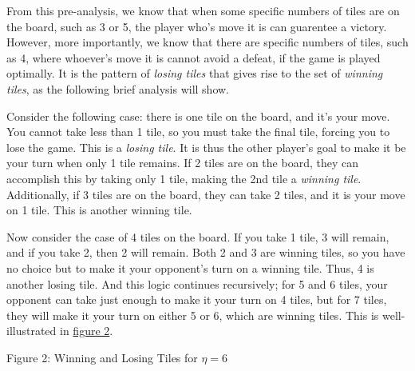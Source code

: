 \documentclass[11pt, letterpaper]{article}
\begin{document}
From this pre-analysis, we know that when some  specific numbers of tiles are on the board, such as 3 or 5, the player who's move it is can guarentee a victory. However, more importantly, we know that there are specific numbers of tiles, such as 4, where whoever's move it is cannot avoid a defeat, if the game is played optimally. It is the pattern of \emph{losing tiles} that gives rise to the set of \emph{winning tiles}, as the following brief analysis will show.

Consider the following case: there is one tile on the board, and it's your move. You cannot take less than 1 tile, so you must take the final tile, forcing you to lose the game. This is a \emph{losing tile}. It is thus the other player's goal to make it be your turn when only 1 tile remains. If 2 tiles are on the board, they can accomplish this by taking only 1 tile, making the 2nd tile a \emph{winning tile}. Additionally, if 3 tiles are on the board, they can take 2 tiles, and it is your move on 1 tile. This is another winning tile.

Now consider the case of 4 tiles on the board. If you take 1 tile, 3 will remain, and if you take 2, then 2 will remain. Both 2 and 3 are winning tiles, so you have no choice but to make it your opponent's turn on a winning tile. Thus, 4 is another losing tile. And this logic continues recursively; for 5 and 6 tiles, your opponent can take just enough to make it your turn on 4 tiles, but for 7 tiles, they will make it your turn on either 5 or 6, which are winning tiles. This is well-illustrated in \hyperlink{fig:2}{figure 2}.

\begin{center}
    
    \noindent Figure 2: Winning and Losing Tiles for $\eta =6$\hypertarget{fig:2}{}
\end{center}
\end{document}

